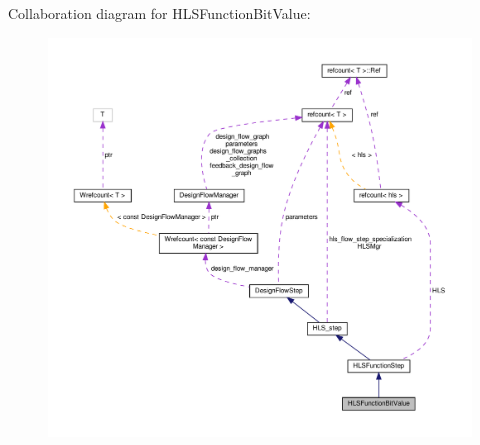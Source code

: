 Collaboration diagram for H\+L\+S\+Function\+Bit\+Value\+:
\nopagebreak
\begin{figure}[H]
\begin{center}
\leavevmode
\includegraphics[width=350pt]{df/d0a/classHLSFunctionBitValue__coll__graph}
\end{center}
\end{figure}
